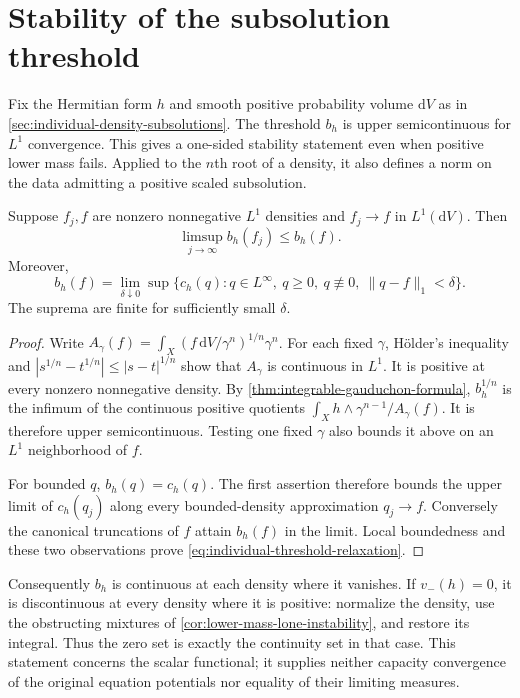 \section{Stability of the subsolution threshold}
\label{sec:individual-density-stability}

Fix the Hermitian form $h$ and smooth positive probability volume $\mathrm{d}V$ as in \cref{sec:individual-density-subsolutions}. The threshold $b_h$ is upper semicontinuous for $L^1$ convergence. This gives a one-sided stability statement even when positive lower mass fails. Applied to the $n$th root of a density, it also defines a norm on the data admitting a positive scaled subsolution.

\begin{theorem}\label{thm:individual-threshold-semicontinuity}
Suppose $f_j,f$ are nonzero nonnegative $L^1$ densities and $f_j\to f$ in $L^1(\mathrm{d}V)$. Then
\[
 \limsup_{j\to\infty}b_h(f_j)\leq b_h(f).
\]
Moreover,
\begin{equation}\label{eq:individual-threshold-relaxation}
 b_h(f)=\lim_{\delta\downarrow0}\sup\{c_h(q):q\in L^\infty,\ q\geq0,\ q\not\equiv0,
                                      \ \|q-f\|_1<\delta\}.
\end{equation}
The suprema are finite for sufficiently small $\delta$.
\end{theorem}
\begin{proof}
Write $A_\gamma(f)=\int_X(f\,\mathrm{d}V/\gamma^n)^{1/n}\gamma^n$. For each fixed $\gamma$, H\"older's inequality and
$|s^{1/n}-t^{1/n}|\leq|s-t|^{1/n}$ show that $A_\gamma$ is continuous in $L^1$. It is positive at every nonzero nonnegative density. By \cref{thm:integrable-gauduchon-formula}, $b_h^{1/n}$ is the infimum of the continuous positive quotients $\int_Xh\wedge\gamma^{n-1}/A_\gamma(f)$. It is therefore upper semicontinuous. Testing one fixed $\gamma$ also bounds it above on an $L^1$ neighborhood of $f$.

For bounded $q$, $b_h(q)=c_h(q)$. The first assertion therefore bounds the upper limit of $c_h(q_j)$ along every bounded-density approximation $q_j\to f$. Conversely the canonical truncations of $f$ attain $b_h(f)$ in the limit. Local boundedness and these two observations prove \eqref{eq:individual-threshold-relaxation}.
\end{proof}

Consequently $b_h$ is continuous at each density where it vanishes. If $v_-(h)=0$, it is discontinuous at every density where it is positive: normalize the density, use the obstructing mixtures of \cref{cor:lower-mass-lone-instability}, and restore its integral. Thus the zero set is exactly the continuity set in that case. This statement concerns the scalar functional; it supplies neither capacity convergence of the original equation potentials nor equality of their limiting measures.

